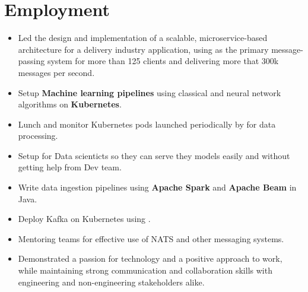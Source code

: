 \section{Employment}

\vspace{0.5cm}
\begin{itemize}
  \item Led the design and implementation of a scalable, microservice-based architecture for a delivery industry application,
        using  as the primary message-passing system for more than 125 clients and delivering
        more that 300k messages per second.
  \item Setup \textbf{Machine learning pipelines} using classical and neural network algorithms on \textbf{Kubernetes}.
  \item Lunch and monitor Kubernetes pods launched periodically by  for data processing.
  \item Setup  for Data scienticts so they can serve they models easily and without getting help from Dev team.
  \item Write data ingestion pipelines using \textbf{Apache Spark} and \textbf{Apache Beam} in Java.
  \item Deploy Kafka on Kubernetes using .
  \item Mentoring teams for effective use of NATS and other messaging systems.
  \item Demonstrated a passion for technology and a positive approach to work,
        while maintaining strong communication and collaboration skills with engineering
        and non-engineering stakeholders alike.
\end{itemize}

\vspace{1cm}

